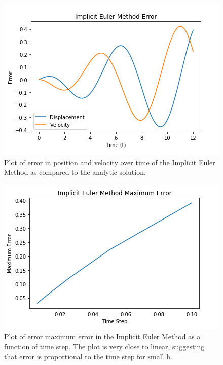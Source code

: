 \documentclass{article}
\begin{document}
\begin{figure}[ht]
\centering
\includegraphics[scale=0.35]{imp_euler_err.png}
\caption{Plot of error in position and velocity over time of the Implicit Euler Method as compared to the analytic solution.}
\label{fig:impeulererr}
\end{figure}

\begin{figure}[ht]
\centering
\includegraphics[scale=0.35]{imp_euler_max_err.png}
\caption{Plot of error maximum error in the Implicit Euler Method as a function of time step. The plot is very close to linear, suggesting that error is proportional to the time step for small h.}
\label{fig:impeulermaxerr}
\end{figure}
\end{document}
